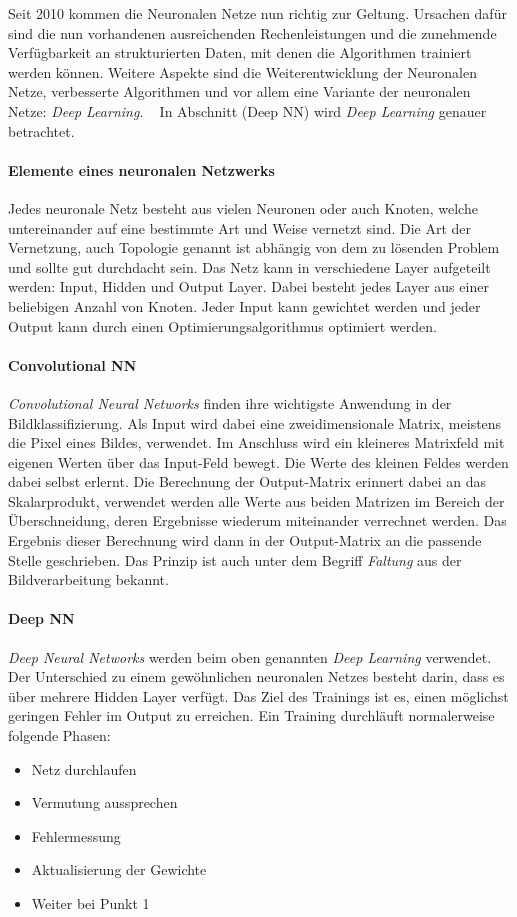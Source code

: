 Seit 2010 kommen die Neuronalen Netze nun richtig zur Geltung. Ursachen dafür sind die nun vorhandenen ausreichenden Rechenleistungen und die zunehmende Verfügbarkeit an strukturierten Daten, mit denen die Algorithmen trainiert werden können. Weitere Aspekte sind die Weiterentwicklung der Neuronalen Netze, verbesserte Algorithmen und vor allem eine Variante der neuronalen Netze: \textit{Deep Learning}. ~\cite{F_neuronaleNetze_3.3.2.2} In Abschnitt (Deep NN) wird \textit{Deep Learning} genauer betrachtet.

\paragraph{Elemente eines neuronalen Netzwerks}
Jedes neuronale Netz besteht aus vielen Neuronen oder auch Knoten, welche untereinander auf eine bestimmte Art und Weise vernetzt sind. Die Art der Vernetzung, auch Topologie genannt ist abhängig von dem zu lösenden Problem und sollte gut durchdacht sein. Das Netz kann in verschiedene Layer aufgeteilt werden: Input, Hidden und Output Layer. Dabei besteht jedes Layer aus einer beliebigen Anzahl von Knoten. Jeder Input kann gewichtet werden und jeder Output kann durch einen Optimierungsalgorithmus optimiert werden. ~\cite{M_DL4J_Many}

\paragraph{Convolutional NN}
\textit{Convolutional Neural Networks} finden ihre wichtigste Anwendung in der Bildklassifizierung. Als Input wird dabei eine zweidimensionale Matrix, meistens die Pixel eines Bildes, verwendet. Im Anschluss wird ein kleineres Matrixfeld mit eigenen Werten über das Input-Feld bewegt. Die Werte des kleinen Feldes werden dabei selbst erlernt. Die Berechnung der Output-Matrix erinnert dabei an das Skalarprodukt, verwendet werden alle Werte aus beiden Matrizen im Bereich der Überschneidung, deren Ergebnisse wiederum miteinander verrechnet werden. Das Ergebnis dieser Berechnung wird dann in der Output-Matrix an die passende Stelle geschrieben. Das Prinzip ist auch unter dem Begriff \textit{Faltung} aus der Bildverarbeitung bekannt. \cite{M_CNN_3.2.2.2}

\newpage

\paragraph{Deep NN}
\textit{Deep Neural Networks} werden beim oben genannten \textit{Deep Learning} verwendet. Der Unterschied zu einem gewöhnlichen neuronalen Netzes besteht darin, dass es über mehrere Hidden Layer verfügt. Das Ziel des Trainings ist es, einen möglichst geringen Fehler im Output zu erreichen. Ein Training durchläuft normalerweise folgende Phasen:
\begin{itemize}
\item Netz durchlaufen
\item Vermutung aussprechen
\item Fehlermessung
\item Aktualisierung der Gewichte
\item Weiter bei Punkt 1
\end{itemize}

